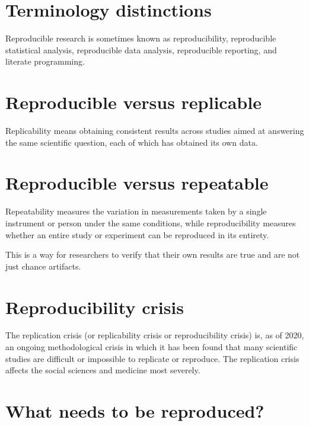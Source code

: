 \documentclass[
]{book}
\begin{document}
\hypertarget{terminology-distinctions}{%
\section{Terminology distinctions}\label{terminology-distinctions}}

Reproducible research is sometimes known as reproducibility, reproducible statistical analysis, reproducible data analysis, reproducible reporting, and literate programming.

\hypertarget{reproducible-versus-replicable}{%
\section{Reproducible versus replicable}\label{reproducible-versus-replicable}}

Replicability means obtaining consistent results across studies aimed at answering the same scientific question, each of which has obtained its own data.

\hypertarget{reproducible-versus-repeatable}{%
\section{Reproducible versus repeatable}\label{reproducible-versus-repeatable}}

Repeatability measures the variation in measurements taken by a single instrument or person under the same conditions, while reproducibility measures whether an entire study or experiment can be reproduced in its entirety.

This is a way for researchers to verify that their own results are true and are not just chance artifacts.

\hypertarget{reproducibility-crisis}{%
\section{Reproducibility crisis}\label{reproducibility-crisis}}

The replication crisis (or replicability crisis or reproducibility crisis) is, as of 2020, an ongoing methodological crisis in which it has been found that many scientific studies are difficult or impossible to replicate or reproduce. The replication crisis affects the social sciences and medicine most severely.

\hypertarget{what-needs-to-be-reproduced}{%
\section{What needs to be reproduced?}\label{what-needs-to-be-reproduced}}
\end{document}
